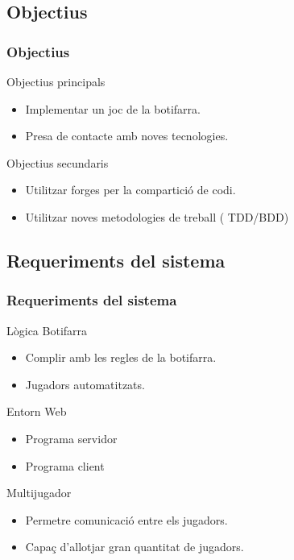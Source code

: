 \documentclass[notitlepage]{beamer}
\begin{document}
\subsection{Objectius}
\begin{frame}
\frametitle{Objectius}
\begin{block}{Objectius principals}
\begin{itemize}
    \item{Implementar un joc de la botifarra.}
    \item{Presa de contacte amb noves tecnologies.}  
\end{itemize}
\end{block}

\begin{block}{Objectius secundaris}
\begin{itemize}
    \item{Utilitzar forges per la compartició de codi.}
    \item{Utilitzar noves metodologies de treball ( TDD/BDD)}  
\end{itemize}
\end{block}

\end{frame}


\subsection{Requeriments del sistema}
\begin{frame}
\frametitle{Requeriments del sistema}
\begin{block}{Lògica Botifarra}
\begin{itemize}
    \item{Complir amb les regles de la botifarra.}
    \item{Jugadors automatitzats.}
\end{itemize}
\end{block}

\begin{block}{Entorn Web}
\begin{itemize}
    \item{Programa servidor}
    \item{Programa client}
\end{itemize}
\end{block}

\begin{block}{Multijugador}
\begin{itemize}
    \item{Permetre comunicació entre els jugadors.}
    \item{Capaç d'allotjar gran quantitat de jugadors.}
\end{itemize}
\end{block}
\end{frame}
\end{document}
